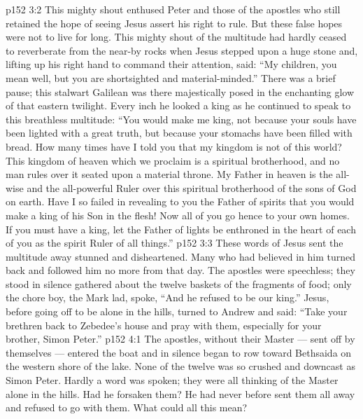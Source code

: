 \vs p152 3:2 This mighty shout enthused Peter and those of the apostles who still retained the hope of seeing Jesus assert his right to rule. But these false hopes were not to live for long. This mighty shout of the multitude had hardly ceased to reverberate from the near\hyp{}by rocks when Jesus stepped upon a huge stone and, lifting up his right hand to command their attention, said: “My children, you mean well, but you are shortsighted and material\hyp{}minded.” There was a brief pause; this stalwart Galilean was there majestically posed in the enchanting glow of that eastern twilight. Every inch he looked a king as he continued to speak to this breathless multitude: \textcolor{ubdarkred}{“You would make me king, not because your souls have been lighted with a great truth, but because your stomachs have been filled with bread. How many times have I told you that my kingdom is not of this world? This kingdom of heaven which we proclaim is a spiritual brotherhood, and no man rules over it seated upon a material throne. My Father in heaven is the all\hyp{}wise and the all\hyp{}powerful Ruler over this spiritual brotherhood of the sons of God on earth. Have I so failed in revealing to you the Father of spirits that you would make a king of his Son in the flesh! Now all of you go hence to your own homes. If you must have a king, let the Father of lights be enthroned in the heart of each of you as the spirit Ruler of all things.”}
\vs p152 3:3 \pc These words of Jesus sent the multitude away stunned and disheartened. Many who had believed in him turned back and followed him no more from that day. The apostles were speechless; they stood in silence gathered about the twelve baskets of the fragments of food; only the chore boy, the Mark lad, spoke, “And he refused to be our king.” Jesus, before going off to be alone in the hills, turned to Andrew and said: \textcolor{ubdarkred}{“Take your brethren back to Zebedee’s house and pray with them, especially for your brother, Simon Peter.”}
\vs p152 4:1 The apostles, without their Master --- sent off by themselves --- entered the boat and in silence began to row toward Bethsaida on the western shore of the lake. None of the twelve was so crushed and downcast as Simon Peter. Hardly a word was spoken; they were all thinking of the Master alone in the hills. Had he forsaken them? He had never before sent them all away and refused to go with them. What could all this mean?
